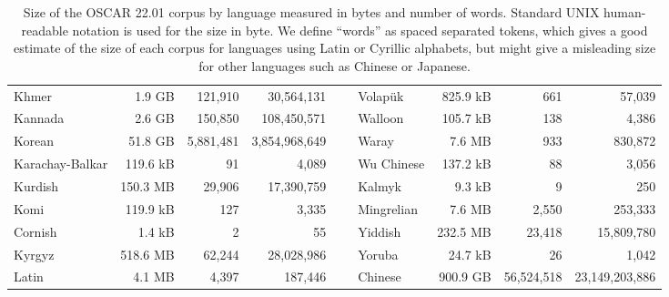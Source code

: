 \begin{table}[ht!]
{\begin{tabular}{lrrrclrrr}
            Khmer                       & 1.9 GB    & 121,910     & 30,564,131      & ~ & Volapük           & 825.9 kB  & 661        & 57,039         \\
            Kannada                     & 2.6 GB    & 150,850     & 108,450,571     & ~ & Walloon           & 105.7 kB  & 138        & 4,386          \\
            Korean                      & 51.8 GB   & 5,881,481   & 3,854,968,649   & ~ & Waray             & 7.6 MB    & 933        & 830,872        \\
            Karachay-Balkar             & 119.6 kB  & 91          & 4,089           & ~ & Wu Chinese        & 137.2 kB  & 88         & 3,056          \\
            Kurdish                     & 150.3 MB  & 29,906      & 17,390,759      & ~ & Kalmyk            & 9.3 kB    & 9          & 250            \\
            Komi                        & 119.9 kB  & 127         & 3,335           & ~ & Mingrelian        & 7.6 MB    & 2,550      & 253,333        \\
            Cornish                     & 1.4 kB    & 2           & 55              & ~ & Yiddish           & 232.5 MB  & 23,418     & 15,809,780     \\
            Kyrgyz                      & 518.6 MB  & 62,244      & 28,028,986      & ~ & Yoruba            & 24.7 kB   & 26         & 1,042          \\
            Latin                       & 4.1 MB    & 4,397       & 187,446         & ~ & Chinese           & 900.9 GB  & 56,524,518 & 23,149,203,886 \\
            \bottomrule
        \end{tabular}
    }
    \caption{Size of the OSCAR 22.01 corpus by language measured in bytes and number of words. Standard UNIX human-readable notation is used for the size in byte. We define ``words'' as spaced separated tokens, which gives a good estimate of the size of each corpus for languages using Latin or Cyrillic alphabets, but might give a misleading size for other languages such as Chinese or Japanese.}
    \label{tab:langs_towards}
\end{table}